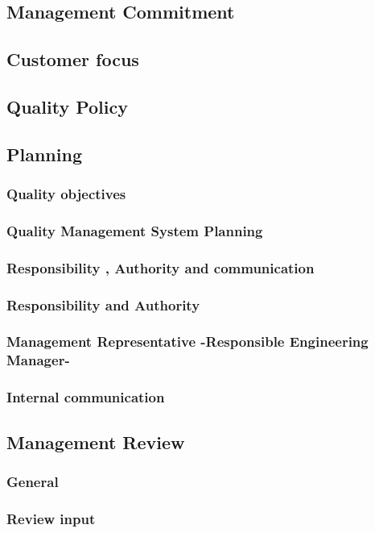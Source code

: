 \documentclass{article}
\begin{document}
\subsection{Management Commitment}
\subsection{Customer focus}
\subsection{Quality Policy}
\subsection{Planning}
\subsubsection{Quality objectives}
\null

\subsubsection{Quality Management System Planning}
\subsubsection{Responsibility , Authority and communication}
\subsubsection{Responsibility and Authority}
\subsubsection{Management Representative -Responsible Engineering Manager-}
\subsubsection{Internal communication}
\subsection{Management Review}
\subsubsection{General}
\subsubsection{Review input}
\end{document}
